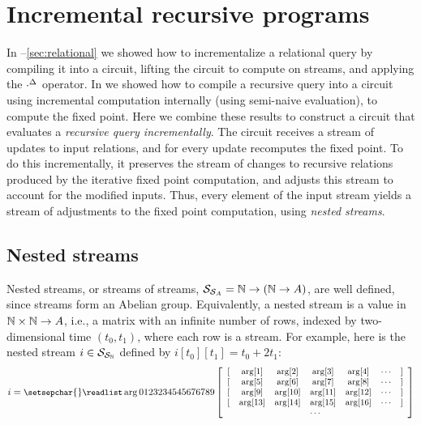 \section{Incremental recursive programs}\label{sec:nested}

In --\ref{sec:relational}
we showed how to incrementalize a relational query by
compiling it into a circuit, lifting the circuit to compute on streams, and
applying the ${\cdot}^{\Delta}$ operator.  In  we showed
how to compile a recursive query into a circuit using incremental
computation internally (using semi-naive evaluation), to compute the fixed point.
Here we combine these results to construct a circuit that evaluates a \emph{recursive
query incrementally}.  The circuit receives a stream of updates to input
relations, and for every update recomputes the fixed point.  To do this
incrementally, it preserves the stream of changes to recursive relations
produced by the iterative fixed point computation, and adjusts this stream to
account for the modified inputs.  Thus, every element of the input stream yields
a stream of adjustments to the fixed point computation, using
\emph{nested streams}.

\subsection{Nested streams}

\newcommand{\ssa}[1]{
  \small
\setsepchar{ }
\readlist\arg{#1}
\begin{bmatrix}
   \begin{array}{ccccccc}
        {[} & \arg[1] & \arg[2] & \arg[3] & \arg[4] & \cdots & {]} \\
        {[} & \arg[5] & \arg[6] & \arg[7] & \arg[8] & \cdots & {]} \\
        {[} & \arg[9] & \arg[10] & \arg[11] & \arg[12] & \cdots & {]} \\
        {[} & \arg[13] & \arg[14] & \arg[15] & \arg[16] & \cdots & {]} \\
        \multicolumn{7}{c}{\cdots}
   \end{array}
\end{bmatrix}
}

Nested streams, or streams of streams, $\mathcal{S}_{\mathcal{S}_{A}} = \mathbb{N}
\rightarrow (\mathbb{N} \rightarrow A)$, are well defined, since streams form
an Abelian group.  Equivalently, a nested stream is a value in $\mathbb{N}
\times \mathbb{N} \to A$, i.e., a matrix with an infinite number of rows,
indexed by two-dimensional time $(t_0, t_1)$, where each row is a
stream.  For example, here is the nested stream $i \in
\mathcal{S}_{\mathcal{S}_{\mathbb{N}}}$ defined by $i[t_0][t_1] = t_0 + 2 t_1$:
$$ i = \ssa{0 1 2 3 2 3 4 5 4 5 6 7 6 7 8 9} $$


